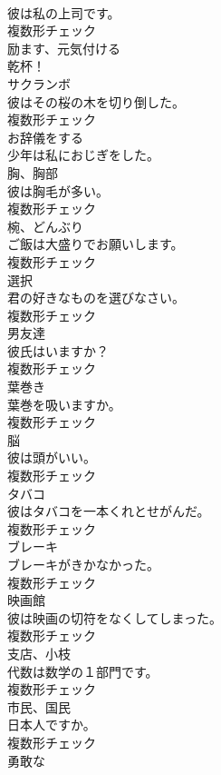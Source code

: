 \documentclass[8pt]{extreport}
\begin{document}
\begin{CJK}{UTF8}{min}
\\	彼は私の上司です。	
\\	複数形チェック
\\	[動詞]	励ます、元気付ける	
\\	乾杯！	
\\	[名詞]	サクランボ	
\\	彼はその桜の木を切り倒した。	
\\	複数形チェック
\\	[動詞]	お辞儀をする	
\\	少年は私におじぎをした。	
\\	[名詞]	胸、胸部	
\\	彼は胸毛が多い。	
\\	複数形チェック
\\	[名詞]	椀、どんぶり	
\\	ご飯は大盛りでお願いします。	
\\	複数形チェック
\\	[名詞]	選択	
\\	君の好きなものを選びなさい。	
\\	複数形チェック
\\	[名詞]	男友達	
\\	彼氏はいますか？	
\\	複数形チェック
\\	[名詞]	葉巻き	
\\	葉巻を吸いますか。	
\\	複数形チェック
\\	[名詞]	脳	
\\	彼は頭がいい。	
\\	複数形チェック
\\	[名詞]	タバコ	
\\	彼はタバコを一本くれとせがんだ。	
\\	複数形チェック
\\	[名詞]	ブレーキ	
\\	ブレーキがきかなかった。	
\\	複数形チェック
\\	[名詞]	映画館	
\\	彼は映画の切符をなくしてしまった。	
\\	複数形チェック
\\	[名詞]	支店、小枝	
\\	代数は数学の１部門です。	
\\	複数形チェック
\\	[名詞]	市⺠、国⺠	
\\	日本人ですか。	
\\	複数形チェック
\\	[形容詞]	勇敢な	

\end{CJK}
\end{document}
